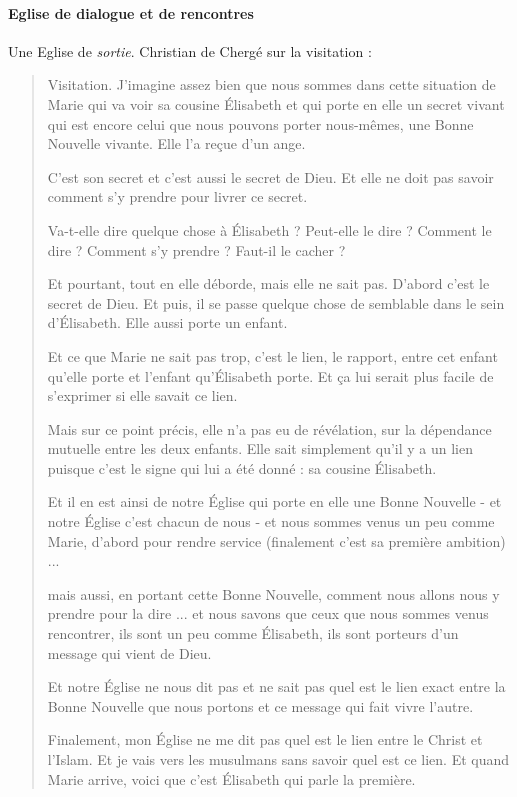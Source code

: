 \paragraph{Eglise de dialogue et de rencontres} Une Eglise de \textit{sortie}. 
Christian de Chergé sur la visitation : 
\begin{quote}
    Visitation. J'imagine assez bien que nous sommes dans cette situation de Marie qui va voir sa cousine Élisabeth et qui porte en elle un secret vivant qui est encore celui que nous pouvons porter nous-mêmes, une Bonne Nouvelle vivante. Elle l'a reçue d'un ange. 
    
    C'est son secret et c'est aussi le secret de Dieu. Et elle ne doit pas savoir comment s'y prendre pour livrer ce secret. 
    
    Va-t-elle dire quelque chose à Élisabeth ? Peut-elle le dire ? Comment le dire ? Comment s'y prendre ? Faut-il le cacher ? 
    
    
    Et pourtant, tout en elle déborde, mais elle ne sait pas. D'abord c'est le secret de Dieu. Et puis, il se passe quelque chose de semblable dans le sein d’Élisabeth. Elle aussi porte un enfant. 
    
    
    Et ce que Marie ne sait pas trop, c'est le lien, le rapport, entre cet enfant qu'elle porte et l'enfant qu’Élisabeth porte. Et ça lui serait plus facile de s'exprimer si elle savait ce lien. 
    
    Mais sur ce point précis, elle n'a pas eu de révélation, sur la dépendance mutuelle entre les deux enfants. Elle sait simplement qu'il y a un lien puisque c'est le signe qui lui a été donné : sa cousine Élisabeth. 

    
    Et il en est ainsi de notre Église qui porte en elle une Bonne Nouvelle - et notre Église c'est chacun de nous - et nous sommes venus un peu comme Marie, d'abord pour rendre service (finalement c'est sa première ambition) ...
    
    
    mais aussi, en portant cette Bonne Nouvelle, comment nous allons nous y prendre pour la dire ... et nous savons que ceux que nous sommes venus rencontrer, ils sont un peu comme Élisabeth, ils sont porteurs d'un message qui vient de Dieu. 
    
    
    Et notre Église ne nous dit pas et ne sait pas quel est le lien exact entre la Bonne Nouvelle que nous portons et ce message qui fait vivre l'autre. 
    
    Finalement, mon Église ne me dit pas quel est le lien entre le Christ et l'Islam. Et je vais vers les musulmans sans savoir quel est ce lien. Et quand Marie arrive, voici que c'est Élisabeth qui parle la première. 
    

\end{quote}
